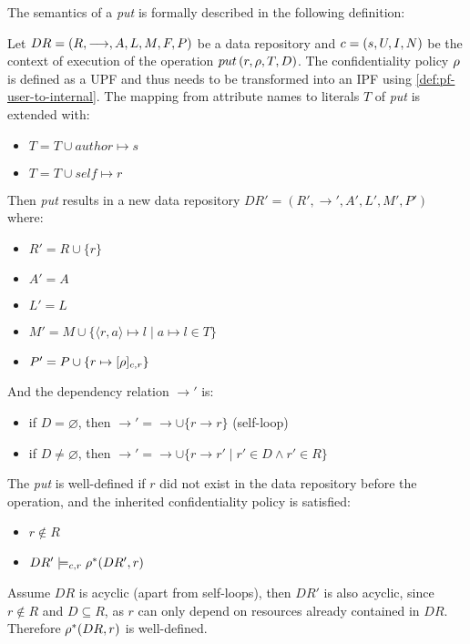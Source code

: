 The semantics of a \emph{put} is formally described in the following definition:
\begin{definition}
Let $DR= \left( R, \longrightarrow, A, L, M, F, P \right)$ be a data repository and $c = \left( s, U, I, N \right)$ be the context of execution of the operation $put \left( r, \rho, T, D \right)$. The confidentiality policy $\rho$ is defined as a UPF and thus needs to be transformed into an IPF using \autoref{def:pf-user-to-internal}. The mapping from attribute names to literals $T$ of \emph{put} is extended with: 
\begin{itemize}
    \item $T = T \cup author \mapsto s$
    \item $T = T \cup self \mapsto r$
\end{itemize}
Then \emph{put} results in a new data repository $DR'=\left(R', \longrightarrow', A', L', M', P' \right)$ where:
\begin{itemize}
    \item $R' = R \cup \{r\}$
    \item $A' = A$
    \item $L' = L$
    \item $M' = M \cup \{ \langle r,a \rangle \mapsto l \mid a \mapsto l \in T \}$
    \item $P' = P \cup \{ r \mapsto [\rho]_{c,r} \}$
\end{itemize}
And the dependency relation $\longrightarrow'$ is:
\begin{itemize}
    \item if $D = \varnothing$, then $\longrightarrow' = \longrightarrow \cup \{r \longrightarrow r\}$ (self-loop)
    \item if $D \neq \varnothing$, then $\longrightarrow' = \longrightarrow \cup \{r \longrightarrow r' \mid r' \in D \land r' \in R \}$
\end{itemize}
The \emph{put} is well-defined if $r$ did not exist in the data repository before the operation, and the inherited confidentiality policy is satisfied:
\begin{itemize}
    \item $r \not\in R$
    \item $DR' \models_{c,r} \rho^{\ast}(DR',r)$
\end{itemize}
Assume $DR$ is acyclic (apart from self-loops), then $DR'$ is also acyclic, since $r \notin R$ and $D \subseteq R$, as $r$ can only depend on resources already contained in $DR$. Therefore $\rho^{\ast}(DR,r)$ is well-defined.
\end{definition}

